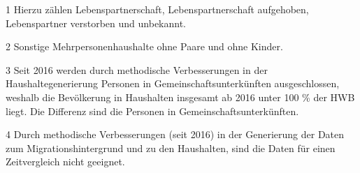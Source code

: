 \documentclass[
  a4paper,
  twoside]{article}
\begin{document}
\begin{table}[!h]
{\begin{threeparttable}
\begin{tablenotes}
\small
\item[1] Hierzu zählen Lebenspartnerschaft, Lebenspartnerschaft aufgehoben, Lebenspartner verstorben und unbekannt.
\item[2] Sonstige Mehrpersonenhaushalte ohne Paare und ohne Kinder.
\item[3] Seit 2016 werden durch methodische Verbesserungen in der Haushaltegenerierung Personen in Gemeinschaftsunterkünften ausgeschlossen, weshalb die Bevölkerung in Haushalten insgesamt ab 2016 unter 100 \% der HWB liegt. Die Differenz sind die Personen in Gemeinschaftsunterkünften.
\item[4] Durch methodische Verbesserungen (seit 2016) in der Generierung der Daten zum Migrationshintergrund und zu den Haushalten, sind die Daten für einen Zeitvergleich nicht geeignet.
\end{tablenotes}
\end{threeparttable}}
\end{table}
\end{document}
